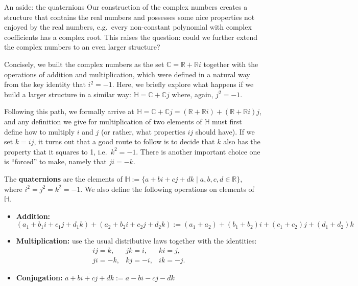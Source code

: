 \begin{section}{An aside: the quaternions}
Our construction of the complex numbers creates a structure that contains the real numbers and possesses some nice properties not enjoyed by the real numbers, e.g.~every non-constant polynomial with complex coefficients has a complex root.  This raises the question: could we further extend the complex numbers to an even larger structure?

Concisely, we built the complex numbers as the set $\mathbb{C} = \mathbb{R} + \mathbb{R}i$ together with the operations of addition and multiplication, which were defined in a natural way from the key identity that $i^2 = -1$. Here, we briefly explore what happens if we build a larger structure in a similar way: $\mathbb{H} = \mathbb{C} + \mathbb{C}j$ where, again, $j^2 = -1$. 

Following this path, we formally arrive at $\mathbb{H} = \mathbb{C} + \mathbb{C}j= (\mathbb{R} + \mathbb{R}i) + (\mathbb{R} + \mathbb{R}i)j$, and any definition we give for multiplication of two elements of $\mathbb{H}$ must first define how to multiply $i$ and $j$ (or rather, what properties $ij$ should have). If we set $k=ij$, it turns out that a good route to follow is to decide that $k$ also has the property that it squares to 1, i.e.~$k^2 = -1$. There is another important choice one is ``forced'' to make, namely that $ji = -k$.

\begin{definition}
The \textbf{quaternions} are the elements of $\mathbb{H} := \{a + bi+ cj + dk\mid a,b,c,d \in \mathbb{R}\}$, where $i^2 = j^2 = k^2= -1$. We also define the following operations on elements of $\mathbb{H}$.
\begin{itemize}
\item \textbf{Addition:} $(a_1 + b_1i+ c_1j + d_1k) + (a_2 + b_2i+ c_2j + d_2k) := (a_1+a_2) + (b_1+b_2)i+ (c_1+c_2)j + (d_1+d_2)k$
\item \textbf{Multiplication:} use the usual distributive laws together with the identities:
\[\begin{array}{lll}
ij = k, &jk = i, &ki = j,\\
ji = -k, &kj = -i, &ik = -j.
\end{array}\]
\item \textbf{Conjugation:} $\overline{a + bi+ cj + dk} := a - bi -cj - dk$
\end{itemize}
\end{definition}


\end{section}
